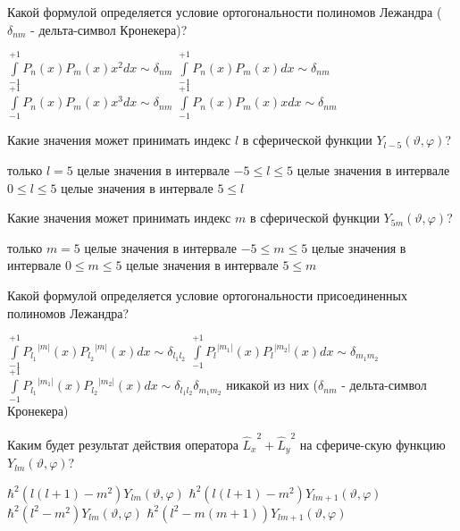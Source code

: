\documentclass[11pt,a4paper]{exam}
\begin{document}
\begin{questions}
\question Какой формулой определяется условие ортогональности полиномов Лежандра (${\delta _{nm}}$ - дельта-символ Кронекера)?
\begin{choices}
\choice $\int\limits_{ - 1}^{ + 1} {{P_n}(x){P_m}(x){x^2}dx \sim {\delta _{nm}}} $       
\choice $\int\limits_{ - 1}^{ + 1} {{P_n}(x){P_m}(x)dx \sim {\delta _{nm}}} $
\choice $\int\limits_{ - 1}^{ + 1} {{P_n}(x){P_m}(x){x^3}dx \sim {\delta _{nm}}} $       
\choice $\int\limits_{ - 1}^{ + 1} {{P_n}(x){P_m}(x)xdx \sim {\delta _{nm}}} $ 
\end{choices}

\question Какие значения может принимать индекс $l$ в сферической функции ${Y_{l - 5}}(\vartheta ,\varphi )$?
\begin{choices}
\choice только $l = 5$             
\choice целые значения в интервале $ - 5 \le l \le 5$
\choice целые значения в интервале $0 \le l \le 5$      
\choice целые значения в интервале $5 \le l$
\end{choices}

\question Какие значения может принимать индекс $m$ в сферической функции ${Y_{5m}}(\vartheta ,\varphi )$?
\begin{choices}
\choice только $m = 5$             
\choice целые значения в интервале $ - 5 \le m \le 5$
\choice целые значения в интервале $0 \le m \le 5$      
\choice целые значения в интервале $5 \le m$
\end{choices}

\question Какой формулой определяется условие ортогональности присоединенных полиномов Лежандра?
\begin{choices}
\choice $\int\limits_{ - 1}^{ + 1} {{P_{{l_1}}}^{|m|}(x){P_{{l_2}}}^{|m|}(x)dx \sim {\delta _{{l_1}{l_2}}}} $       
\choice $\int\limits_{ - 1}^{ + 1} {{P_l}^{|{m_1}|}(x){P_l}^{|{m_2}|}(x)dx}  \sim {\delta _{{m_1}{m_2}}}$
\choice $\int\limits_{ - 1}^{ + 1} {{P_{{l_1}}}^{|{m_1}|}(x){P_{{l_2}}}^{|{m_2}|}(x)dx}  \sim {\delta _{{l_1}{l_2}}}{\delta _{{m_1}{m_2}}}$    
\choice никакой из них (${\delta _{nm}}$ - дельта-символ Кронекера)
\end{choices}

\question Каким будет результат действия оператора ${\hat L_x}^2 + {\hat L_y}^2$ на сфериче-скую функцию ${Y_{lm}}(\vartheta ,\varphi )$?
\begin{choices}
\choice ${\hbar ^2}\left( {l(l + 1) - {m^2}} \right){Y_{lm}}(\vartheta ,\varphi )$       
\choice ${\hbar ^2}\left( {l(l + 1) - {m^2}} \right){Y_{lm + 1}}(\vartheta ,\varphi )$
\choice ${\hbar ^2}\left( {{l^2} - {m^2}} \right){Y_{lm}}(\vartheta ,\varphi )$       
\choice ${\hbar ^2}\left( {{l^2} - m(m + 1)} \right){Y_{lm + 1}}(\vartheta ,\varphi )$
\end{choices}


\end{questions}
\end{document}
